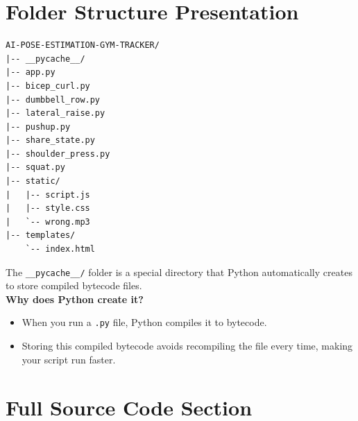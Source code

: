 \section*{Folder Structure Presentation}
\begin{tcolorbox}[colback=black!5, colframe=black!80, title=Folder Structure Presentation as a tree diagram]
\begin{verbatim}
AI-POSE-ESTIMATION-GYM-TRACKER/
|-- __pycache__/
|-- app.py
|-- bicep_curl.py
|-- dumbbell_row.py
|-- lateral_raise.py
|-- pushup.py
|-- share_state.py
|-- shoulder_press.py
|-- squat.py
|-- static/
|   |-- script.js
|   |-- style.css
|   `-- wrong.mp3
|-- templates/
    `-- index.html
\end{verbatim}
\end{tcolorbox}

\begin{tcolorbox}[colback=gray!10, colframe=gray!10, title=]
         {The }\verb|__pycache__/| {folder is a special directory that Python automatically creates to store compiled bytecode files.}\\
         {\textbf{Why does Python create it?}}
        \begin{itemize}
            \item { {When you run a} \verb|.py| {file, Python compiles it to bytecode.}}
            \item {{Storing this compiled bytecode avoids recompiling the file every time, making your script run faster.}}
        \end{itemize}
\end{tcolorbox}

\section*{Full Source Code Section}

